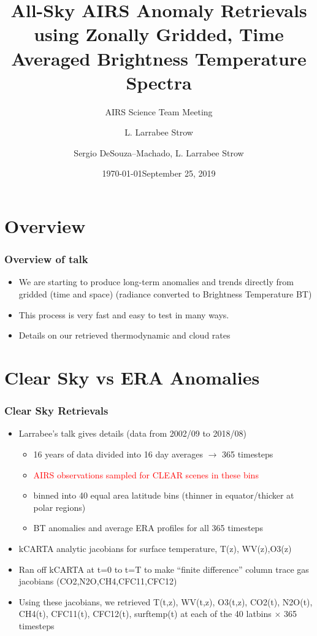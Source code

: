 \documentclass[10pt,t]{beamer}
\author{L. Larrabee Strow}
\date{\today}
\title{\large All-Sky AIRS Anomaly Retrievals \newline
  using Zonally Gridded, Time Averaged \newline
  Brightness Temperature Spectra}
\subtitle{\footnotesize{AIRS Science Team Meeting}}
\date{\vspace{0.1in}\footnotesize{September 25, 2019 \vfill}}
\author{Sergio DeSouza--Machado\inst{1,2}, L. Larrabee Strow\inst{1,2}}
\institute[UMBC]{\inst{1} UMBC Physics Dept. \and \inst{2}UMBC JCET}
\begin{document}
\maketitle
{}

\section{Overview}
\begin{frame}
  \frametitle{Overview of talk}
  \begin{itemize}
  \item We are starting to produce long-term anomalies and trends directly from gridded (time and space)
        (radiance converted to Brightness Temperature BT)
  \item This process is very fast and easy to test in many ways.
  \item Details on our retrieved thermodynamic and cloud rates
  \end{itemize}
\end{frame}

\section{Clear Sky vs ERA Anomalies}
\begin{frame}
  \frametitle{Clear Sky Retrievals}
  \begin{itemize}
    \item Larrabee's talk gives details (data from 2002/09 to 2018/08)
      \begin{itemize}
        \item 16 years of data divided into 16 day averages $\rightarrow$ 365 timesteps
        \item \textcolor{red}{AIRS observations sampled for CLEAR scenes in these bins}
        \item binned into 40 equal area latitude bins (thinner in equator/thicker at polar regions)
        \item BT anomalies and average ERA profiles for all 365 timesteps
      \end{itemize}
    \item kCARTA analytic jacobians for surface temperature, T(z), WV(z),O3(z)
    \item Ran off kCARTA at t=0 to t=T to make ``finite difference'' column trace gas jacobians
          (CO2,N2O,CH4,CFC11,CFC12)
    \item Using these jacobians, we retrieved T(t,z), WV(t,z), O3(t,z), CO2(t), N2O(t), CH4(t), 
          CFC11(t), CFC12(t), surftemp(t)
          at each of the 40 latbins $\times $ 365 timesteps
  \end{itemize}
\end{frame}
\end{document}
